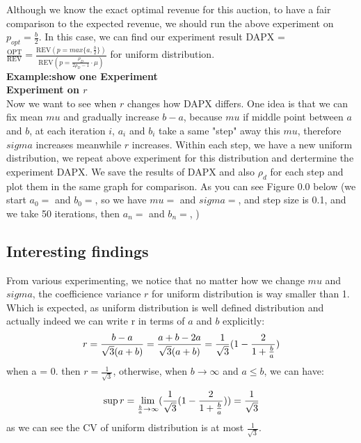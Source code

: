 Although we know the exact optimal revenue for this auction, to have a fair comparison to the expected revenue, we should run the above experiment on $p_{opt} = \frac{b}{2}$. In this case, we can find our experiment result DAPX =$\frac{\text{OPT}}{\text{REV}} = \frac{\text{REV}(p=max \{a,\frac{b}{2}\})}{\text{REV}(p=\frac{\rho_{D}}{2\rho_{D}-1}\cdot \mu)}$ for uniform distribution. \\
\textbf{Example:show one Experiment}\\
\textbf{Experiment on $r$}\\
Now we want to see when $r$ changes how DAPX differs. One idea is that we can fix mean $mu$ and gradually increase $b-a$, because $mu$ if middle point between $a$ and $b$, at each iteration $i$, $a_i$ and $b_i$ take a same "step" away this $mu$, therefore $sigma$ increases meanwhile $r$ increases. Within each step, we have a new uniform distribution, we repeat above experiment for this distribution and dertermine the experiment DAPX. We save  the results of DAPX and also $\rho_d$ for each step and plot them in the same graph for comparison. As you can see Figure 0.0 below
(we start $a_0 = $ and $b_0 = $, so we have $mu = $  and $sigma =$, and step size is 0.1, and we take 50 iterations, then $a_n =$ and $b_n=$,         )\\



\subsection{Interesting findings}
\label{sec:chap:uniDAPX}
From various experimenting, we notice that no matter how we change $mu$ and $sigma$, the coefficience variance $r$ for uniform distribution is way smaller than 1. Which is expected, as uniform distribution is well defined distribution and actually indeed we can write r in terms of $a$ and $b$ explicitly:
\begin{equation}\notag
r = \frac {b-a}{\sqrt{3}(a+b)} = \frac {a+b-2a}{\sqrt{3}(a+b)} = \frac {1}{\sqrt{3}} (1-  \frac {2}{1+\frac{b}{a}})
\end{equation} 
when a = 0. then $r = \frac {1}{\sqrt{3}}$, otherwise, when $b \rightarrow \infty$ and $a\leqslant b$, we can have:

\begin{equation}\notag
\sup r = \displaystyle{\lim_{\frac{b}{a} \to \infty}}(\frac {1}{\sqrt{3}} (1-  \frac {2}{1+\frac{b}{a}})) = \frac {1}{\sqrt{3}}  
\end{equation} 
as we can see the CV of uniform distribution is at most $\frac {1}{\sqrt{3}}$.

